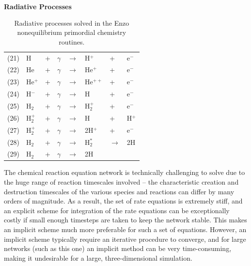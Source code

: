 \begin{table}
\begin{center}
{\bfseries Radiative Processes}\\[1ex]
\begin{tabular}{llllllll}
(21) & H & + & $\gamma$ & $\rightarrow$ & H$^+$ & + & e$^-$ \\
(22) & He & + & $\gamma$ & $\rightarrow$ & He$^+$ & + & e$^-$ \\
(23) & He$^+$ & + & $\gamma$ & $\rightarrow$ & He$^{++}$ & + & e$^-$ \\
(24) & H$^-$ & + & $\gamma$ & $\rightarrow$ & H & + & e$^-$ \\
(25) & H$_2$ & + & $\gamma$ & $\rightarrow$ & H$_2^+$ & + & e$^-$ \\
(26) & H$_2^+$ & + & $\gamma$ & $\rightarrow$ & H & + & H$^+$ \\
(27) & H$_2^+$ & + & $\gamma$ & $\rightarrow$ & 2H$^+$ & + & e$^-$ \\
(28) & H$_2$ & + & $\gamma$ & $\rightarrow$ & H$_2^*$ & $\rightarrow$ & 2H \\
(29) & H$_2$ & + & $\gamma$ & $\rightarrow$ & 2H &  & 
\end{tabular}
\caption[]{Radiative processes solved in the Enzo nonequilibrium
primordial chemistry routines.}
\label{table.radiative}
\end{center}
\end{table}


The chemical reaction equation network is technically challenging to solve due to 
the huge range of reaction timescales involved -- the characteristic creation
and destruction timescales of the various species and reactions can differ by 
many orders of magnitude.  As a result, the set of rate equations is extremely 
stiff, and an explicit scheme for integration of the rate equations can be 
exceptionally costly if small enough timesteps are taken to keep the network
stable.  This makes an implicit scheme much more preferable for such a set of 
equations.  However, an implicit scheme typically require an iterative 
procedure to converge, and for large networks (such as this one) an implicit
method can be very time-consuming, making it undesirable for a large, three-dimensional
simulation.

